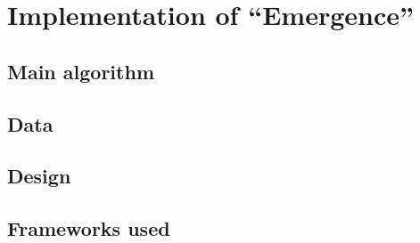 \chapter{Implementation of ``Emergence''}

\section{Main algorithm}

\section{Data}

\section{Design}

\section{Frameworks used}
